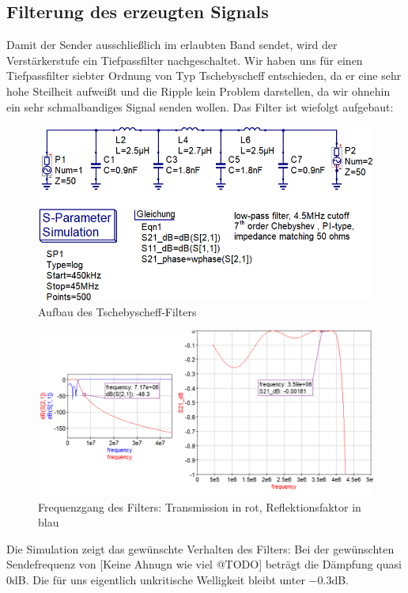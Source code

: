 \subsection{Filterung des erzeugten Signals}
Damit der Sender ausschließlich im erlaubten Band sendet, wird der Verstärkerstufe
ein Tiefpassfilter nachgeschaltet. Wir haben uns für einen Tiefpassfilter siebter 
Ordnung von Typ Tschebyscheff entschieden, da er eine sehr hohe Steilheit aufweißt
und die Ripple kein Problem darstellen, da wir ohnehin ein sehr schmalbandiges
Signal senden wollen. Das Filter ist wiefolgt aufgebaut:
\begin{figure}[H]
    \includegraphics{res/TP_Schaltplan.png}
    \caption{Aufbau des Tschebyscheff-Filters}
\end{figure}

\begin{figure}[H]
    \includegraphics[scale=0.6]{res/TP_Simulation.png}
    \caption{Frequenzgang des Filters: Transmission in rot, Reflektionsfaktor in blau}
\end{figure}
Die Simulation zeigt das gewünschte Verhalten des Filters: Bei der gewünschten
Sendefrequenz von [Keine Ahnugn wie viel @TODO] beträgt die Dämpfung quasi $0$dB.
Die für uns eigentlich unkritische Welligkeit bleibt unter $-0.3$dB.

